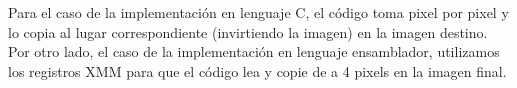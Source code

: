 \documentclass[a4paper]{article}
\begin{document}
\begin{figure}[!ht]
    \centering
    \begin{floatrow}
    \end{floatrow}
\end{figure}

Para el caso de la implementación en lenguaje C, el código toma pixel por pixel y lo copia al lugar correspondiente (invirtiendo la imagen)
en la imagen destino.
Por otro lado, el caso de la implementación en lenguaje ensamblador, utilizamos los registros XMM para que el código lea y copie de a 4 pixels
en la imagen final.
\end{document}
